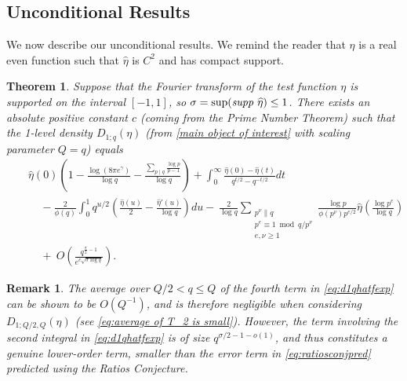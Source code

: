 \documentclass[12pt,reqno]{amsart}
\numberwithin{equation}{section}
\theoremstyle{plain}
\newtheorem{theorem}[thm]{Theorem}
\newtheorem{remark}[thm]{Remark}
\begin{document}
\subsection{Unconditional Results}\label{sec:unconditionalresults}
We now describe our unconditional results. We remind the reader that $\eta$ is a real even function such that $\widehat \eta$ is $C^2$ and has compact support.
\begin{theorem}
\label{thm unconditional}
Suppose that the Fourier transform of the test function $\eta$ is supported on the interval $[-1,1]$, so $\sigma = \sup(\text{\emph{supp} } {\widehat{\eta}})\leq 1$. There exists an absolute positive constant $c$ (coming from the Prime Number Theorem) such that the 1-level density $D_{1;q}(\eta)$ (from \eqref{main object of interest} with scaling parameter $Q=q$) equals
\begin{eqnarray}\label{eq:d1qhatfexp} & & {\widehat{\eta}}(0) \left(  1-\frac { \log(8\pi e^{\gamma})}{\log q}-\frac{\sum_{p\mid q}\frac{\log p}{p-1}}{\log q}\right)
+\int_0^{\infty}\frac{{\widehat{\eta}}(0)-{\widehat{\eta}}(t)}{q^{t/2}-q^{-t/2}} dt \nonumber\\
& &\ \ \ \ \  -\frac 2{\phi(q)} \int_0^{1} q^{u/2}\left(\frac {{\widehat{\eta}}(u)}2 -\frac {{\widehat{\eta}}'(u)}{\log q}\right) du -\ \frac 2{\log q} \sum_{\substack{p^{\nu}\parallel q \\ p^e \equiv 1 \bmod q/p^{\nu} \\ e, \nu \geq 1}}\frac{\log p}{\phi(p^{\nu})p^{e/2}}{\widehat{\eta}}\left( \frac{\log p^{e}}{\log q}\right)\nonumber\\ & & \ \ \ \ \  +\ O\left(\frac{q^{\frac{\sigma}2-1}}{e^{c \sqrt{\sigma\log q}}}\right).\end{eqnarray}
\end{theorem}

\begin{remark}\label{rek:beatratios}
The average over $Q/2<q \leq Q$ of the fourth term in \eqref{eq:d1qhatfexp} can be shown to be $O(Q^{-1})$, and is therefore negligible when considering $D_{1;Q/2,Q}(\eta)$ (see \eqref{eq:average of T_2 is small}). However, the term involving the second integral in \eqref{eq:d1qhatfexp} is of size $q^{\sigma/2-1-o(1)} $, and thus constitutes a genuine lower-order term, smaller than the error term in \eqref{eq:ratiosconjpred} predicted using the Ratios Conjecture.
\end{remark}
\end{document}
